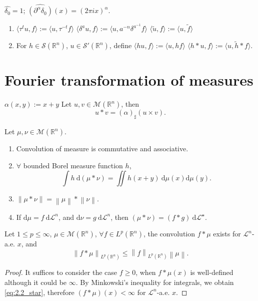 \begin{remark}\label{rmk:delta_transform}
$\hat{\delta _{0}}=1$; $\widehat{(\partial ^{\alpha}\delta _{0})}(x)=(2\pi ix)^{\alpha}$.
\end{remark}

\begin{definition}\label{def:distribution_trans_conv}
\begin{enumerate}[label=(\roman*)]
    \item $\langle \tau ^{t}u,f \rangle:= \langle u,\tau ^{-t}f \rangle$
   $\langle \delta ^{a}u,f \rangle:= \langle u, a^{-n}\delta ^{a^{-1}}f \rangle$
   $\langle \tilde{u},f \rangle:=\langle u,\tilde{f} \rangle$
    \item For $h \in \mathscr{S}(\mathbb{R}^{n})$, $u \in \mathscr{S}'(\mathbb{R}^{n})$, define
   $\langle hu,f \rangle:=\langle u,hf \rangle$
   $\langle h*u,f \rangle:=\langle u, \tilde{h}*f \rangle$.
\end{enumerate}
\end{definition}


\section{Fourier transformation of measures}
$\alpha(x,y):= x+y$
Let $u,v \in \mathcal{M}(\mathbb{R}^{n})$, then
$$u*v=(\alpha)_{\sharp}(u\times v).$$

\begin{proposition}\label{prop:2.1}
Let $\mu,\nu \in \mathcal{M}(\mathbb{R}^{n})$.
\begin{enumerate}[label=(\roman*)]
    \item Convolution of measure is commutative and associative.
    \item $\forall$ bounded Borel measure function $h$, $$\int h\ \mathrm{d}(\mu*\nu)=\iint h(x+y)\ \mathrm{d}\mu(x)\mathrm{d}\mu(y).$$
    \item $\left\| \mu*\nu \right\|=\left\| \mu \right\|*\left\| \nu \right\|$.
    \item If $\mathrm{d}\mu=f\ \mathrm{d}\mathcal{L}^{n}$, and $\mathrm{d}\nu= g\ \mathrm{d}\mathcal{L}^{n}$, then $(\mu*\nu)=(f*g)\ \mathrm{d}\mathcal{L^{n}}$.
\end{enumerate}
\end{proposition}

\begin{proposition}\label{prop:2.2}
Let $1\leq p\leq \infty$, $\mu \in \mathcal{M}(\mathbb{R}^{n})$, $\forall f\in L^{p}(\mathbb{R}^{n})$, the convolution $f*\mu$ exists for $\mathcal{L}^{n}$-a.e. $x$, and
\begin{equation}\label{eq:2.2_star}
\left\| f*\mu \right\| _{L^{p}(\mathbb{R}^{n})}\leq \left\| f \right\| _{L^{p}(\mathbb{R}^{n})}\left\| \mu \right\|.
\end{equation}
\end{proposition}
\begin{proof}
It suffices to consider the case $f\geq {0}$, when $f*\mu(x)$ is well-defined although it could be $\infty$. By Minkowski's inequality for integrals, we obtain \eqref{eq:2.2_star}, therefore $(f*\mu)(x)<\infty$ for $\mathcal{L}^{n}$-a.e. $x$.
\end{proof}

